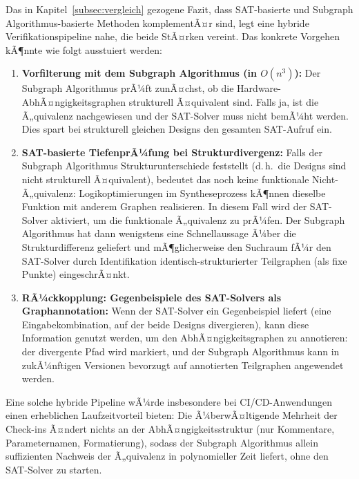 ﻿\documentclass[12pt,a4paper]{report}
\begin{document}
Das in Kapitel~\ref{subsec:vergleich} gezogene Fazit, dass SAT-basierte und
Subgraph Algorithmus-basierte Methoden komplementÃ¤r sind, legt eine hybride
Verifikationspipeline nahe, die beide StÃ¤rken vereint. Das konkrete Vorgehen kÃ¶nnte
wie folgt ausstuiert werden:

\begin{enumerate}
    \item \textbf{Vorfilterung mit dem Subgraph Algorithmus (in $O(n^3)$):}
          Der Subgraph Algorithmus prÃ¼ft zunÃ¤chst, ob die Hardware-AbhÃ¤ngigkeitsgraphen
          strukturell Ã¤quivalent sind. Falls ja, ist die Ã„quivalenz nachgewiesen und der
          SAT-Solver muss nicht bemÃ¼ht werden. Dies spart bei strukturell gleichen
          Designs den gesamten SAT-Aufruf ein.
    \item \textbf{SAT-basierte TiefenprÃ¼fung bei Strukturdivergenz:}
          Falls der Subgraph Algorithmus Strukturunterschiede feststellt (d.\,h.\ die
          Designs sind nicht strukturell Ã¤quivalent), bedeutet das noch keine funktionale
          Nicht-Ã„quivalenz: Logikoptimierungen im Syntheseprozess kÃ¶nnen dieselbe Funktion
          mit anderem Graphen realisieren. In diesem Fall wird der SAT-Solver aktiviert,
          um die funktionale Ã„quivalenz zu prÃ¼fen. Der Subgraph Algorithmus hat dann
          wenigstens eine Schnellaussage Ã¼ber die Strukturdifferenz geliefert und
          mÃ¶glicherweise den Suchraum fÃ¼r den SAT-Solver durch Identifikation
          identisch-strukturierter Teilgraphen (als fixe Punkte) eingeschrÃ¤nkt.
    \item \textbf{RÃ¼ckkopplung: Gegenbeispiele des SAT-Solvers als Graphannotation:}
          Wenn der SAT-Solver ein Gegenbeispiel liefert (eine Eingabekombination, auf der
          beide Designs divergieren), kann diese Information genutzt werden, um den
          AbhÃ¤ngigkeitsgra\-phen zu annotieren: der divergente Pfad wird markiert,
          und der Subgraph Algorithmus kann in zukÃ¼nftigen Versionen bevorzugt auf
          annotierten Teilgraphen angewendet werden.
\end{enumerate}

Eine solche hybride Pipeline wÃ¼rde insbesondere bei CI/CD-Anwendungen einen erheblichen
Laufzeitvorteil bieten: Die Ã¼berwÃ¤ltigende Mehrheit der Check-ins Ã¤ndert nichts an der
AbhÃ¤ngigkeitsstruktur (nur Kommentare, Parameternamen, Formatierung), sodass der
Subgraph Algorithmus allein suffizienten Nachweis der Ã„quivalenz in polynomieller Zeit
liefert, ohne den SAT-Solver zu starten.
\end{document}
